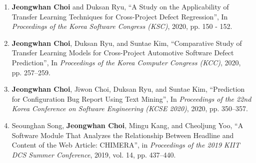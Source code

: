 \documentclass[10pt]{article}
\newenvironment{changemargin}[2]{
  \begin{list}{}{
    \setlength{\topsep}{0pt}
    \setlength{\leftmargin}{#1}
    \setlength{\rightmargin}{#2}
    \setlength{\listparindent}{\parindent}
    \setlength{\itemindent}{\parindent}
    \setlength{\parsep}{\parskip}
  }
  \item[]}{\end{list}
}
\newenvironment{body} {
	\vspace*{-16pt}
	\begin{changemargin}{-0.25in}{-0.5in}
  }
	{\end{changemargin}
}
\begin{document}
\begin{body}
\begin{enumerate}
    \item \textbf{Jeongwhan Choi} and Duksan Ryu, ``A Study on the Applicability of Transfer Learning Techniques for Cross-Project Defect Regression'', In \emph{Proceedings of the Korea Software Congress (KSC)}, 2020, pp. 150 - 152.
    \item \textbf{Jeongwhan Choi}, Duksan Ryu, and Suntae Kim, ``Comparative Study of Transfer Learning Models for Cross-Project Automotive Software Defect Prediction'', In \emph{Proceedings of the Korea Computer Congress (KCC)}, 2020, pp. 257–259.
    \item \textbf{Jeongwhan Choi}, Jiwon Choi, Duksan Ryu, and Suntae Kim, ``Prediction for Configuration Bug Report Using Text Mining'', In \emph{Proceedings of the 22nd Korea Conference on Software Engineering (KCSE 2020)}, 2020, pp. 350–357.
    \item Seounghan Song, \textbf{Jeongwhan Choi}, Mingu Kang, and Cheoljung Yoo, ``A Software Module That Analyzes the Relationship Between Headline and Content of the Web Article: CHIMERA'', in \emph{Proceedings of the 2019 KIIT DCS Summer Conference}, 2019, vol. 14, pp. 437–440.
\end{enumerate}


\end{body}
\end{document}

